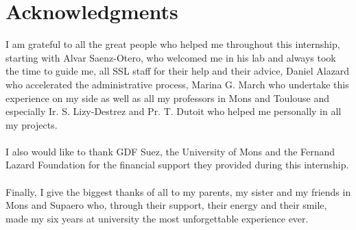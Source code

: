 \section*{Acknowledgments}
I am grateful to all the great people who helped me throughout this internship, starting with Alvar Saenz-Otero, who welcomed me in his lab and always took the time to guide me, all SSL staff for their help and their advice, Daniel Alazard who accelerated the administrative process, Marina G. March who undertake this experience on my side as well as all my professors in Mons and Toulouse and especially Ir. S. Lizy-Destrez and Pr. T. Dutoit who helped me personally in all my projects.\\\\
I also would like to thank GDF Suez, the University of Mons and the Fernand Lazard Foundation for the financial support they provided during this internship.\\\\
Finally, I give the biggest thanks of all to my parents, my sister and my friends in Mons and Supaero who, through their support, their energy and their smile, made my six years at university the most unforgettable experience ever.

